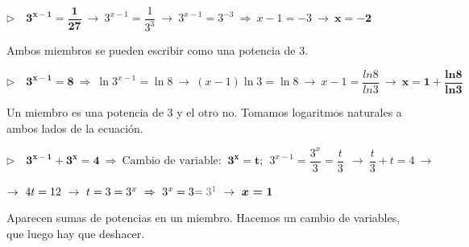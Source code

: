 \begin{miejemplo}

$\triangleright \quad \boldsymbol{3^{x-1}=\dfrac 1{27}} \ \to \ 3^{x-1}=\dfrac 1{3^3}\ \to \ 3^{x-1}=3^{-3}\ \Rightarrow \ x-1=-3 \ \to \ \boldsymbol{x=-2}$

\vspace{2mm} Ambos miembros se pueden escribir como una potencia de 3.

\vspace{4mm} $\triangleright \quad \boldsymbol{3^{x-1}=8} \ \Rightarrow \ \ln 3^{x-1}=\ln 8 \ \to \ (x-1)\ln 3= \ln 8 \ \to \ x-1=\dfrac{ln8}{ln3} \ \to \  \boldsymbol{x=1+\dfrac{ln8}{ln3}}$

\vspace{2mm} Un miembro es una potencia de 3 y el otro no. Tomamos logaritmos naturales a ambos lados de la ecuación.

\vspace{4mm} $\triangleright \quad \boldsymbol{3^{x-1}+3^x=4} \ \Rightarrow \ \text{Cambio de variable: } \ \boldsymbol{3^x=t};\ \ 3^{x-1}=\dfrac{3^x}{3}=\dfrac t 3 \ \ \to \ \dfrac t 3 + t=4 \ \to $

$\to \ 4t=12 \ \to \  t=3=3^x \ \Rightarrow \ 3^x=3 \textcolor{gris}{=3^1} \ \to \ \boldsymbol{x=1}$

\vspace{2mm} Aparecen sumas de potencias en un miembro.	Hacemos un cambio de variables, que luego hay que deshacer.
\end{miejemplo}

